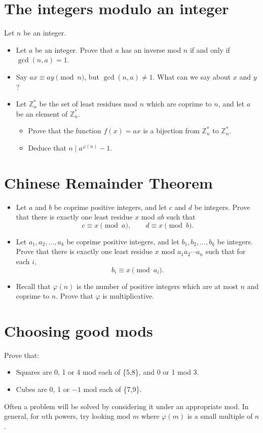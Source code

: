 \documentclass{article}
\begin{document}
\section{The integers modulo an integer}
  Let $n$ be an integer.
  \begin{itemize}
    \item Let $a$ be an integer. Prove that $a$ has an inverse mod $n$ if and
      only if $\gcd(n,a)=1$.
    \item Say $ax\equiv ay\pmod n$, but $\gcd(n,a)\ne 1$. What can we say
      about $x$ and $y$?
    \item Let $\mathbb Z_n^*$ be the set of least residues mod $n$ which are
      coprime to $n$, and let $a$ be an element of $\mathbb Z_n^*$.
      \begin{itemize}
        \item 
          Prove that the function $f(x)=ax$ is a bijection from $\mathbb Z_n^*$
          to $\mathbb Z_n^*$.
        \item Deduce that $n\mid a^{\varphi(n)}-1$.
      \end{itemize}
  \end{itemize}
\section{Chinese Remainder Theorem}
\begin{itemize}
  \item
  Let $a$ and $b$ be coprime positive integers, and let $c$ and $d$ be integers.
  Prove that there is exactly one least residue $x$ mod $ab$ such that
  \[c\equiv x\pmod a,\qquad d\equiv x\pmod b.\]
  \item Let $a_1,a_2,\ldots,a_k$ be coprime positive integers, and let
    $b_1,b_2,\ldots,b_k$ be integers. Prove that there is exactly one least
    residue $x$ mod $a_1a_2\cdots a_n$ such that for each $i$,
    \[b_i\equiv x\pmod {a_i}.\]
  \item Recall that $\varphi(n)$ is the number of positive integers which are at
    most $n$ and coprime to $n$. Prove that $\varphi$ is multiplicative.
\end{itemize}
\section{Choosing good mods}
  Prove that:
  \begin{itemize}
    \item Squares are 0, 1 or 4 mod each of \{5,8\}, and 0 or 1 mod 3.
    \item Cubes are 0, 1 or $-1$ mod each of \{7,9\}.
  \end{itemize}
  Often a problem will be solved by considering it under an appropriate mod.
  In general, for $n$th powers, try looking mod $m$ where $\varphi(m)$ is a
  small multiple of $n$.
\end{document}
